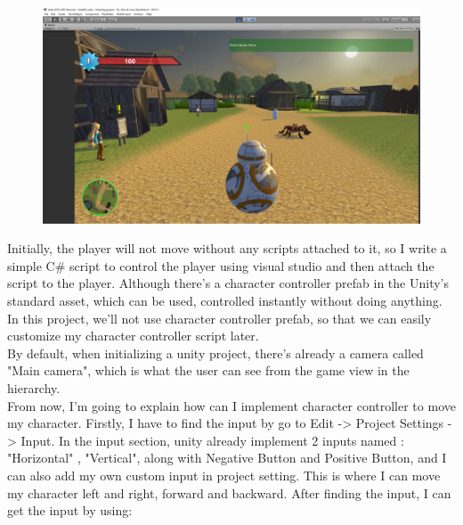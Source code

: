 \documentclass[a4paper, 13pt]{extarticle}
\begin{document}
 	 \begin{figure}[h]
 	 	\centering
 	 	\begin{minipage}{1\textwidth}
 	 		\centering
 	 		\includegraphics[width=0.75\linewidth]{intructions/4.png}
 	 		\label{fig:test5}
 	 	\end{minipage}
 	 \end{figure}
 	  
 	 Initially, the player will not move without any scripts attached to it, so I write a simple C\# script to control the player using visual studio and then attach the script to the player. Although there's a character controller prefab in the Unity's standard asset, which can be used, controlled instantly without doing anything. In this project, we'll not use character controller prefab, so that we can easily customize my character controller script later. \\[0.25cm] By default, when initializing a unity project, there's already a camera called "Main camera", which is what the user can see from the game view in the hierarchy.  
 	 \\[0.25cm] From now, I'm going to explain how can I implement character controller to move my character. Firstly, I have to find the input by go to Edit -> Project Settings -> Input. In the input section, unity already implement 2 inputs named : "Horizontal" , "Vertical", along with Negative Button and Positive Button, and I can also add my own custom input in project setting. This is where I can move my character left and right, forward and backward. After finding the input, I can get the input by using: 
  
\end{document}
